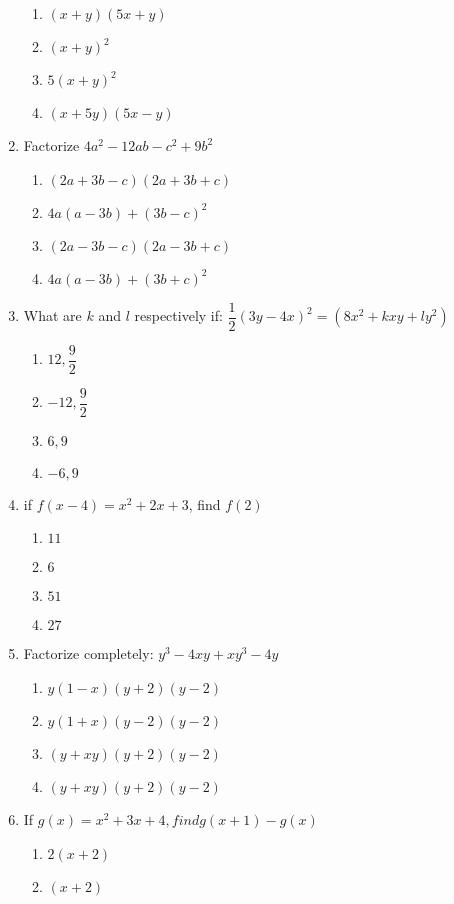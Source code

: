 \begin{multicols}{2}
\begin{enumerate}[label={\arabic*.}]
	\begin{enumerate}[label={\Alph*.}]
	\item \((x+y)(5x+y)\)
	\item \((x+y)^2\)
	\item \(5(x+y)^2\)
	\item \((x+5y)(5x-y)\)
	\end{enumerate}
\item Factorize \(4a^2-12ab-c^2+9b^2\)
	\begin{enumerate}[label={\Alph*.}]
	\item \((2a+3b-c)(2a+3b+c)\)
	\item \(4a(a-3b)+(3b-c)^2\)
	\item \((2a-3b-c)(2a-3b+c)\)
	\item \(4a(a-3b) + (3b+c)^2\)
	\end{enumerate}
\item What are \(k\) and \(l\) respectively if: \(\dfrac{1}{2}(3y-4x)^2 = (8{x}^{2}+kxy+ly^2)\)
	\begin{enumerate}[label={\Alph*.}]
	\item \(12, \dfrac{9}{2}\)
	\item \(-12, \dfrac{9}{2}\)
	\item \(6, 9\)
	\item \(-6, 9\)
	\end{enumerate}
\item if \(f(x-4) = {x}^{2}+2x+3\), find \(f(2)\)
	\begin{enumerate}[label={\Alph*.}]
	\item \(11\)
	\item \(6\)
	\item \(51\)
	\item \(27\)
	\end{enumerate}
\item Factorize completely: \(y^3-4xy+xy^3-4y\)
	\begin{enumerate}[label={\Alph*.}]
	\item \(y(1-x)(y+2)(y-2)\)
	\item \(y(1+x)(y-2)(y-2)\)
	\item \((y+xy)(y+2)(y-2)\)
	\item \((y+xy)(y+2)(y-2)\)
	\end{enumerate}
\item If \(g(x) = {x}^{2}+3x+4, find g(x+1) -g(x)\)
	\begin{enumerate}[label={\Alph*.}]
	\item \(2(x+2)\)
	\item \((x+2)\)

\end{enumerate}
\end{enumerate}
\end{multicols}
